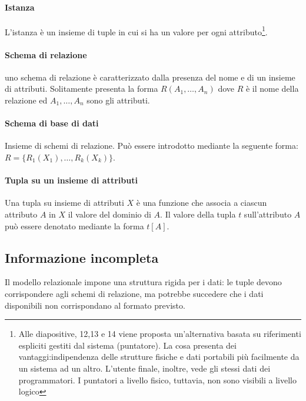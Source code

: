 \paragraph{Istanza} L'istanza è un insieme di tuple in cui si ha un valore per ogni attributo\footnote{Alle diapositive, 12,13 e 14 viene proposta un'alternativa basata su riferimenti espliciti gestiti dal sistema (puntatore). La cosa presenta dei vantaggi:indipendenza delle strutture fisiche e dati portabili più facilmente da un sistema ad un altro. L'utente finale, inoltre, vede gli stessi dati dei programmatori. I puntatori a livello fisico, tuttavia, non sono visibili a livello logico}.
\paragraph{Schema di relazione} uno schema di relazione è caratterizzato dalla presenza del nome e di un insieme di attributi. Solitamente presenta la forma $R(A_1,\dots,A_n)$ dove $R$ è il nome della relazione ed $A_1,\dots,A_n$ sono gli attributi.
\paragraph{Schema di base di dati} Insieme di schemi di relazione. Può essere introdotto mediante la seguente forma: $R = \{ R_1(X_1),\dots,R_k(X_k)\}$.
\paragraph{Tupla su un insieme di attributi} Una tupla su insieme di attributi $X$ è una funzione che associa a ciascun attributo $A$ in $X$ il valore del dominio di $A$. Il valore della tupla $t$ sull'attributo $A$ può essere denotato mediante la forma $t[A]$.
\subsection{Informazione incompleta}
Il modello relazionale impone una struttura rigida per i dati: le tuple devono corrispondere agli schemi di relazione, ma potrebbe succedere che i dati disponibili non corrispondano al formato previsto. 
